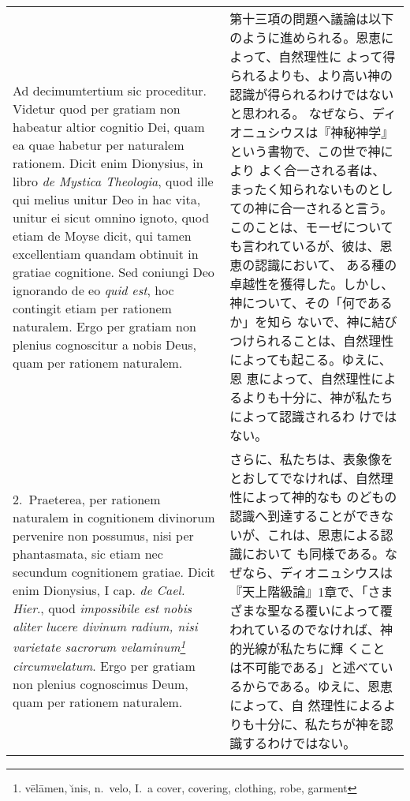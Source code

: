 \documentclass[10pt]{jsarticle} %
\begin{document}
\begin{longtable}{p{21em}p{21em}}


{\sc Ad decimumtertium sic proceditur}. Videtur quod per gratiam non
habeatur altior cognitio Dei, quam ea quae habetur per naturalem
rationem. Dicit enim Dionysius, in libro {\it de Mystica Theologia},
quod ille qui melius unitur Deo in hac vita, unitur ei sicut omnino
ignoto, quod etiam de Moyse dicit, qui tamen excellentiam quandam
obtinuit in gratiae cognitione. Sed coniungi Deo ignorando de eo {\it
quid est}, hoc contingit etiam per rationem naturalem. Ergo per
gratiam non plenius cognoscitur a nobis Deus, quam per rationem
naturalem.


&

第十三項の問題へ議論は以下のように進められる。恩恵によって、自然理性に
よって得られるよりも、より高い神の認識が得られるわけではないと思われる。
なぜなら、ディオニュシウスは『神秘神学』という書物で、この世で神により
よく合一される者は、まったく知られないものとしての神に合一されると言う。
このことは、モーゼについても言われているが、彼は、恩恵の認識において、
ある種の卓越性を獲得した。しかし、神について、その「何であるか」を知ら
ないで、神に結びつけられることは、自然理性によっても起こる。ゆえに、恩
恵によって、自然理性によるよりも十分に、神が私たちによって認識されるわ
けではない。

\\




2.~{\sc Praeterea}, per rationem naturalem in cognitionem divinorum
pervenire non possumus, nisi per phantasmata, sic etiam nec secundum
cognitionem gratiae. Dicit enim Dionysius, I cap. {\it de
Cael. Hier}., quod {\it impossibile est nobis aliter lucere divinum
radium, nisi varietate sacrorum velaminum\footnote{v\={e}l\={a}men,
\u{\i}nis, n.\ velo, I.~a cover, covering, clothing, robe, garment}
circumvelatum}. Ergo per gratiam non plenius cognoscimus Deum, quam
per rationem naturalem.


&

さらに、私たちは、表象像をとおしてでなければ、自然理性によって神的なも
のどもの認識へ到達することができないが、これは、恩恵による認識において
も同様である。なぜなら、ディオニュシウスは『天上階級論』1章で、「さま
ざまな聖なる覆いによって覆われているのでなければ、神的光線が私たちに輝
くことは不可能である」と述べているからである。ゆえに、恩恵によって、自
然理性によるよりも十分に、私たちが神を認識するわけではない。

\\





\end{longtable}
\end{document}
